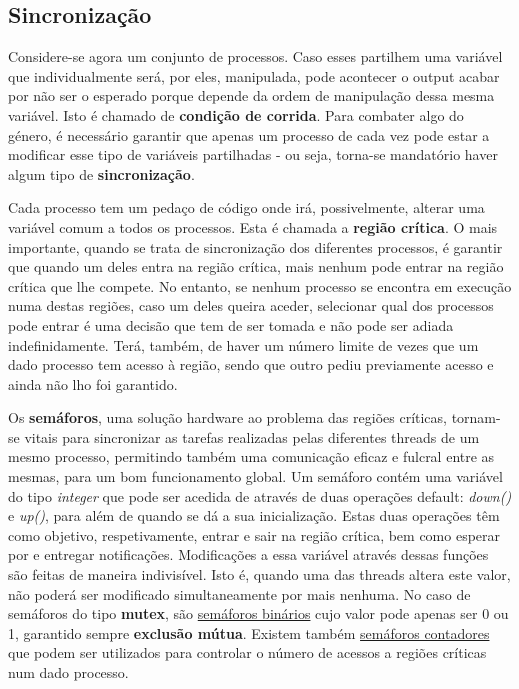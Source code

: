 \documentclass[10pt,portuguese]{article}
\begin{document}
\subsection{Sincronização}
\par Considere-se agora um conjunto de processos. Caso esses partilhem uma variável que individualmente será, por eles, manipulada, pode acontecer o output acabar por não ser o esperado porque depende da ordem de manipulação dessa mesma variável. Isto é chamado de \textbf{condição de corrida}. Para combater algo do género, é necessário garantir que apenas um processo de cada vez pode estar a modificar esse tipo de variáveis partilhadas - ou seja, torna-se mandatório haver algum tipo de \textbf{sincronização}.
\par Cada processo tem um pedaço de código onde irá, possivelmente, alterar uma variável comum a todos os processos. Esta é chamada a \textbf{região crítica}. O mais importante, quando se trata de sincronização dos diferentes processos, é garantir que quando um deles entra na região crítica, mais nenhum pode entrar na região crítica que lhe compete. No entanto, se nenhum processo se encontra em execução numa destas regiões, caso um deles queira aceder, selecionar qual dos processos pode entrar é uma decisão que tem de ser tomada e não pode ser adiada indefinidamente. Terá, também, de haver um número limite de vezes que um dado processo tem acesso à região, sendo que outro pediu previamente acesso e ainda não lho foi garantido.
\par Os \textbf{semáforos}, uma solução hardware ao problema das regiões críticas, tornam-se vitais para sincronizar as tarefas realizadas pelas diferentes threads de um mesmo processo, permitindo também uma comunicação eficaz e fulcral entre as mesmas, para um bom funcionamento global. Um semáforo contém uma variável do tipo \textit{integer} que pode ser acedida de através de duas operações default: \textit{down()} e \textit{up()}, para além de quando se dá a sua inicialização. Estas duas operações têm como objetivo, respetivamente, entrar e sair na região crítica, bem como esperar por e entregar notificações. Modificações a essa variável através dessas funções são feitas de maneira indivisível. Isto é, quando uma das threads altera este valor, não poderá ser modificado simultaneamente por mais nenhuma. No caso de semáforos do tipo \textbf{mutex}, são \underline{semáforos binários} cujo valor pode apenas ser 0 ou 1, garantido sempre \textbf{exclusão mútua}. Existem também \underline{semáforos contadores} que podem ser utilizados para controlar o número de acessos a regiões críticas num dado processo.
\end{document}
